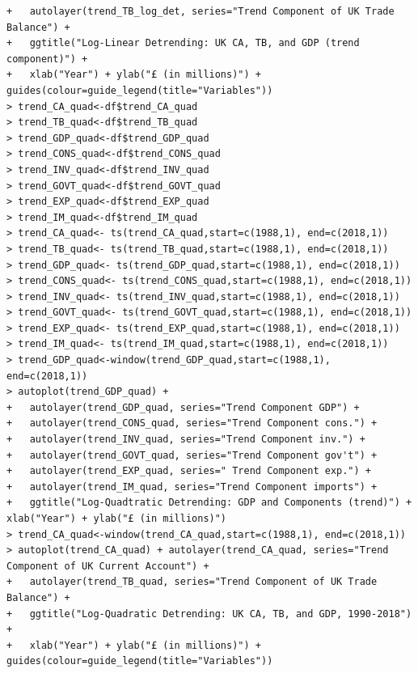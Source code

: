 \documentclass[12pt]{article}
\begin{document}
\begin{verbatim}
+   autolayer(trend_TB_log_det, series="Trend Component of UK Trade Balance") +
+   ggtitle("Log-Linear Detrending: UK CA, TB, and GDP (trend component)") + 
+   xlab("Year") + ylab("£ (in millions)") + guides(colour=guide_legend(title="Variables"))
> trend_CA_quad<-df$trend_CA_quad
> trend_TB_quad<-df$trend_TB_quad
> trend_GDP_quad<-df$trend_GDP_quad
> trend_CONS_quad<-df$trend_CONS_quad
> trend_INV_quad<-df$trend_INV_quad
> trend_GOVT_quad<-df$trend_GOVT_quad
> trend_EXP_quad<-df$trend_EXP_quad	
> trend_IM_quad<-df$trend_IM_quad
> trend_CA_quad<- ts(trend_CA_quad,start=c(1988,1), end=c(2018,1))
> trend_TB_quad<- ts(trend_TB_quad,start=c(1988,1), end=c(2018,1))
> trend_GDP_quad<- ts(trend_GDP_quad,start=c(1988,1), end=c(2018,1))
> trend_CONS_quad<- ts(trend_CONS_quad,start=c(1988,1), end=c(2018,1))
> trend_INV_quad<- ts(trend_INV_quad,start=c(1988,1), end=c(2018,1))
> trend_GOVT_quad<- ts(trend_GOVT_quad,start=c(1988,1), end=c(2018,1))
> trend_EXP_quad<- ts(trend_EXP_quad,start=c(1988,1), end=c(2018,1))
> trend_IM_quad<- ts(trend_IM_quad,start=c(1988,1), end=c(2018,1))
> trend_GDP_quad<-window(trend_GDP_quad,start=c(1988,1), end=c(2018,1)) 
> autoplot(trend_GDP_quad) +
+   autolayer(trend_GDP_quad, series="Trend Component GDP") +
+   autolayer(trend_CONS_quad, series="Trend Component cons.") +
+   autolayer(trend_INV_quad, series="Trend Component inv.") +
+   autolayer(trend_GOVT_quad, series="Trend Component gov't") +
+   autolayer(trend_EXP_quad, series=" Trend Component exp.") +
+   autolayer(trend_IM_quad, series="Trend Component imports") +
+   ggtitle("Log-Quadtratic Detrending: GDP and Components (trend)") + xlab("Year") + ylab("£ (in millions)")
> trend_CA_quad<-window(trend_CA_quad,start=c(1988,1), end=c(2018,1)) 
> autoplot(trend_CA_quad) + autolayer(trend_CA_quad, series="Trend Component of UK Current Account") +
+   autolayer(trend_TB_quad, series="Trend Component of UK Trade Balance") +
+   ggtitle("Log-Quadratic Detrending: UK CA, TB, and GDP, 1990-2018") + 
+   xlab("Year") + ylab("£ (in millions)") + guides(colour=guide_legend(title="Variables"))
\end{verbatim}
\end{document}
